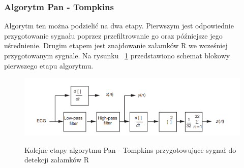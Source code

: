 \subsubsection{Algorytm Pan - Tompkins}

Algorytm ten można podzielić na dwa etapy. Pierwszym jest odpowiednie przygotowanie sygnału poprzez przefiltrowanie go oraz późniejsze jego uśrednienie. Drugim etapem jest znajdowanie załamków R we wcześniej przygotowanym sygnale. Na rysunku ~\ref{fig:RPPTA} przedstawiono schemat blokowy pierwszego etapu algorytmu.
\begin{figure}[H]
\centering
\includegraphics[scale=0.4]{R_PEAKS/img/pan_tompkins_alg}
\label{fig:RPPTA}
\caption{Kolejne etapy algorytmu Pan - Tompkins przygotowujące sygnał do detekcji załamków R}
\end{figure}
